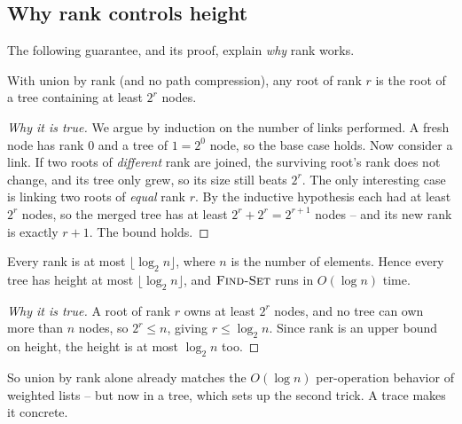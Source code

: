 \subsection{Why rank controls height}
\label{ch19:rank-bound}

The following guarantee, and its proof, explain \emph{why} rank works.

\begin{lemma}
\label{ch19:lem-rank-size}
With union by rank (and no path compression), any root of rank $r$ is the root
of a tree containing at least $2^r$ nodes.
\end{lemma}

\begin{proof}[Why it is true]
We argue by induction on the number of links performed. A fresh node has rank
$0$ and a tree of $1 = 2^0$ node, so the base case holds. Now consider a link.
If two roots of \emph{different} rank are joined, the surviving root's rank does
not change, and its tree only grew, so its size still beats $2^r$. The only
interesting case is linking two roots of \emph{equal} rank $r$. By the
inductive hypothesis each had at least $2^r$ nodes, so the merged tree has at
least $2^r + 2^r = 2^{r+1}$ nodes -- and its new rank is exactly $r+1$. The
bound holds.
\end{proof}

\begin{corollary}
\label{ch19:cor-rank-log}
Every rank is at most $\lfloor \log_2 n \rfloor$, where $n$ is the number of
elements. Hence every tree has height at most $\lfloor \log_2 n \rfloor$, and
$\textsc{Find-Set}$ runs in $O(\log n)$ time.
\end{corollary}

\begin{proof}[Why it is true]
A root of rank $r$ owns at least $2^r$ nodes, and no tree can own more than $n$
nodes, so $2^r \le n$, giving $r \le \log_2 n$. Since rank is an upper bound on
height, the height is at most $\log_2 n$ too.
\end{proof}

So union by rank alone already matches the $O(\log n)$ per-operation behavior of
weighted lists -- but now in a tree, which sets up the second trick. A trace
makes it concrete.

